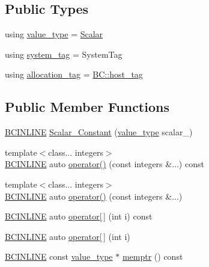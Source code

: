 \subsection*{Public Types}
\begin{DoxyCompactItemize}
\item 
using \hyperlink{structBC_1_1tensors_1_1exprs_1_1Scalar__Constant_a132ee57f3d537e185f9937eec1359759}{value\+\_\+type} = \hyperlink{namespaceBC_1_1tensors_1_1common__using_a22de9a173f6aa6b07a3b4f543c9ad5c1}{Scalar}
\item 
using \hyperlink{structBC_1_1tensors_1_1exprs_1_1Scalar__Constant_a8931dfee8e0cae0d760eb1fc0227921d}{system\+\_\+tag} = System\+Tag
\item 
using \hyperlink{structBC_1_1tensors_1_1exprs_1_1Scalar__Constant_a49b99255f1362355bba5114229f5341c}{allocation\+\_\+tag} = \hyperlink{structBC_1_1host__tag}{B\+C\+::host\+\_\+tag}
\end{DoxyCompactItemize}
\subsection*{Public Member Functions}
\begin{DoxyCompactItemize}
\item 
\hyperlink{BlackCat__Common_8h_a6699e8b0449da5c0fafb878e59c1d4b1}{B\+C\+I\+N\+L\+I\+NE} \hyperlink{structBC_1_1tensors_1_1exprs_1_1Scalar__Constant_ab9aec86bc37874d9f0eed932124196a6}{Scalar\+\_\+\+Constant} (\hyperlink{structBC_1_1tensors_1_1exprs_1_1Scalar__Constant_a132ee57f3d537e185f9937eec1359759}{value\+\_\+type} scalar\+\_\+)
\item 
{\footnotesize template$<$class... integers$>$ }\\\hyperlink{BlackCat__Common_8h_a6699e8b0449da5c0fafb878e59c1d4b1}{B\+C\+I\+N\+L\+I\+NE} auto \hyperlink{structBC_1_1tensors_1_1exprs_1_1Scalar__Constant_a82910a197ed67af5237572cc817b2f5f}{operator()} (const integers \&...) const 
\item 
{\footnotesize template$<$class... integers$>$ }\\\hyperlink{BlackCat__Common_8h_a6699e8b0449da5c0fafb878e59c1d4b1}{B\+C\+I\+N\+L\+I\+NE} auto \hyperlink{structBC_1_1tensors_1_1exprs_1_1Scalar__Constant_ab595102f5eb0d0b12fb215defde87668}{operator()} (const integers \&...)
\item 
\hyperlink{BlackCat__Common_8h_a6699e8b0449da5c0fafb878e59c1d4b1}{B\+C\+I\+N\+L\+I\+NE} auto \hyperlink{structBC_1_1tensors_1_1exprs_1_1Scalar__Constant_a66d39f85a901cb5cbdb0f3acd0d38dcc}{operator\mbox{[}$\,$\mbox{]}} (int i) const 
\item 
\hyperlink{BlackCat__Common_8h_a6699e8b0449da5c0fafb878e59c1d4b1}{B\+C\+I\+N\+L\+I\+NE} auto \hyperlink{structBC_1_1tensors_1_1exprs_1_1Scalar__Constant_a0e567c0293efb8402c1dbdb7750f5a9e}{operator\mbox{[}$\,$\mbox{]}} (int i)
\item 
\hyperlink{BlackCat__Common_8h_a6699e8b0449da5c0fafb878e59c1d4b1}{B\+C\+I\+N\+L\+I\+NE} const \hyperlink{structBC_1_1tensors_1_1exprs_1_1Scalar__Constant_a132ee57f3d537e185f9937eec1359759}{value\+\_\+type} $\ast$ \hyperlink{structBC_1_1tensors_1_1exprs_1_1Scalar__Constant_a0ddbfcda5667b85f958695b93669bdac}{memptr} () const 
\end{DoxyCompactItemize}

